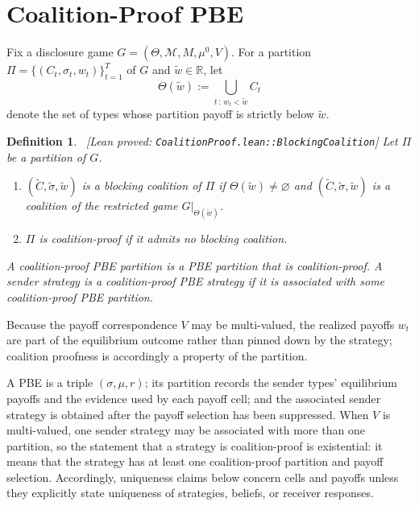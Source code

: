 \documentclass[11pt]{article}
\newtheorem{definition}{Definition}
\newcommand{\Msg}{\mathcal{M}}
\newcommand{\leanproved}[1]{{\footnotesize\textsf{\textcolor{green!55!black}{[Lean proved: \texttt{#1}]}}}}
\begin{document}
\section{Coalition-Proof PBE}\label{sec:cppbe}

Fix a disclosure game $G=(\Theta,\Msg,M,\mu^0,V)$. For a partition $\Pi=\{(C_t,\sigma_t,w_t)\}_{t=1}^T$ of $G$ and $\widetilde w\in\mathbb{R}$, let
\[
    \Theta(\widetilde w)
    :=
    \bigcup_{t\,:\,w_t<\widetilde w} C_t
\]
denote the set of types whose partition payoff is strictly below $\widetilde w$.

\begin{definition}\label{dfn:blocking}\ \leanproved{CoalitionProof.lean::BlockingCoalition}
    Let $\Pi$ be a partition of $G$.
    \begin{enumerate}
        \item[(i)] $(\widetilde C,\widetilde\sigma,\widetilde w)$ is a
        \emph{blocking coalition} of $\Pi$ if
        $\Theta(\widetilde w)\neq\varnothing$ and
        $(\widetilde C,\widetilde\sigma,\widetilde w)$ is a coalition of
        the restricted game $G\vert_{\Theta(\widetilde w)}$.
        \item[(ii)] $\Pi$ is \emph{coalition-proof} if it admits no
        blocking coalition.
    \end{enumerate}
    A \emph{coalition-proof PBE partition} is a PBE partition that is
    coalition-proof. A sender strategy is a \emph{coalition-proof PBE
    strategy} if it is associated with some coalition-proof PBE partition.
\end{definition}

Because the payoff correspondence $V$ may be multi-valued, the realized payoffs $w_t$ are part of the equilibrium outcome rather than pinned down by the strategy; coalition proofness is accordingly a property of the partition.

 A PBE is a triple $(\sigma,\mu,r)$; its partition records the sender types' equilibrium payoffs and the evidence used by each payoff cell; and the associated sender strategy is obtained after the payoff selection has been suppressed. When $V$ is multi-valued, one sender strategy may be associated with more than one partition, so the statement that a strategy is coalition-proof is existential: it means that the strategy has at least one coalition-proof partition and payoff selection. Accordingly, uniqueness claims below concern cells and payoffs unless they explicitly state uniqueness of strategies, beliefs, or receiver responses.
\end{document}
